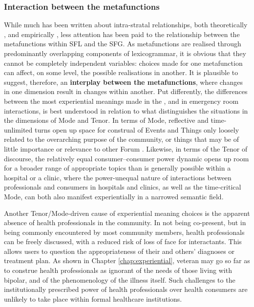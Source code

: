 \subsubsection{Interaction between the metafunctions}

While much has been written about intra\hyp{}stratal relationships, both theoretically \cite[e.g.][]{hasan_structure_1985}, and empirically \cite[e.g.][]{clarke_patterns_2012}, less attention has been paid to the relationship between the metafunctions within \gls{SFL} and the \gls{SFG}. As metafunctions are realised through predominantly overlapping components of lexicogrammar, it is obvious that they cannot be completely independent variables: choices made for one metafunction can affect, on some level, the possible realisations in another. It is plausible to suggest, therefore, an \textbf{interplay between the metafunctions}, where changes in one dimension result in changes within another. Put differently, the differences between the most experiential meanings made in the , and in emergency room interactions, is best understood in relation to what distinguishes the situations in the dimensions of \gls{Mode} and Tenor. In terms of \gls{Mode}, reflective and time\hyp{}unlimited turns open up space for construal of Events and Things only loosely related to the overarching purpose of the community, or things that may be of little importance or relevance to other \gls{Forum} . Likewise, in terms of the Tenor of discourse, the relatively equal consumer--consumer power dynamic opens up room for a broader range of appropriate topics than is generally possible within a hospital or a clinic, where the power\hyp{}unequal nature of interactions between professionals and consumers in hospitals and clinics, as well as the time\hyp{}critical \gls{Mode}, can both also manifest experientially in a narrowed semantic field.

Another Tenor\slash \gls{Mode}\hyp{}driven cause of experiential meaning choices is the apparent absence of health professionals in the community. In not being co\hyp{}present, but in being commonly encountered by most community members, health professionals can be freely discussed, with a reduced risk of loss of face for interactants. This allows users to question the appropriateness of their and others' diagnoses or treatment plan. As shown in Chapter \ref{chap:experiential}, veteran  may go so far as to construe health professionals as ignorant of the needs of those living with \gls{bipolar}, and of the phenomenology of the illness itself. Such challenges to the institutionally prescribed power of health professionals over health consumers are unlikely to take place within formal healthcare institutions.

